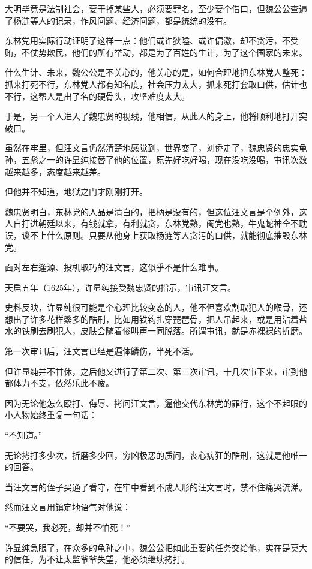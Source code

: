 \begin{multicols}{\theparacolNo}
		大明毕竟是法制社会，要干掉某些人，必须要罪名，至少要个借口，但魏公公查遍了杨涟等人的记录，作风问题、经济问题，都是统统的没有。

		东林党用实际行动证明了这样一点：他们或许狭隘、或许偏激，却不贪污，不受贿，不仗势欺民，他们的所有举动，都是为了百姓的生计，为了这个国家的未来。

		什么生计、未来，魏公公是不关心的，他关心的是，如何合理地把东林党人整死：抓来打死不行，东林党人都有知名度，社会压力太大，抓来死打套取口供，估计也不行，这帮人是出了名的硬骨头，攻坚难度太大。

		于是，另一个人进入了魏忠贤的视线，他相信，从此人的身上，他将顺利地打开突破口。

		虽然在牢里，但汪文言仍然清楚地感觉到，世界变了，刘侨走了，魏忠贤的忠实龟孙，五彪之一的许显纯接替了他的位置，原先好吃好喝，现在没吃没喝，审讯次数越来越多，态度越来越差。

		但他并不知道，地狱之门才刚刚打开。

		魏忠贤明白，东林党的人品是清白的，把柄是没有的，但这位汪文言是个例外，这人自打进朝廷以来，有钱就拿，有利就贪，东林党熟，阉党也熟，牛鬼蛇神全不耽误，谈不上什么原则。只要从他身上获取杨涟等人贪污的口供，就能彻底摧毁东林党。

		面对左右逢源、投机取巧的汪文言，这似乎不是什么难事。

		天启五年（1625年），许显纯接受魏忠贤的指示，审讯汪文言。

		史料反映，许显纯很可能是个心理比较变态的人，他不但喜欢割取犯人的喉骨，还想出了许多花样繁多的酷刑，比如用铁钩扎穿琵琶骨，把人吊起来，或是用沾着盐水的铁刷去刷犯人，皮肤会随着惨叫声一同脱落。所谓审讯，就是赤裸裸的折磨。

		第一次审讯后，汪文言已经是遍体鳞伤，半死不活。

		但许显纯并不甘休，之后他又进行了第二次、第三次审讯，十几次审下来，审到他都体力不支，依然乐此不疲。

		因为无论他怎么殴打、侮辱、拷问汪文言，逼他交代东林党的罪行，这个不起眼的小人物始终重复一句话：

		“不知道。”

		无论拷打多少次，折磨多少回，穷凶极恶的质问，丧心病狂的酷刑，这就是他唯一的回答。

		当汪文言的侄子买通了看守，在牢中看到不成人形的汪文言时，禁不住痛哭流涕。

		然而汪文言用镇定地语气对他说：

		“不要哭，我必死，却并不怕死！”

		许显纯急眼了，在众多的龟孙之中，魏公公把如此重要的任务交给他，实在是莫大的信任，为不让太监爷爷失望，他必须继续拷打。


\end{multicols}
